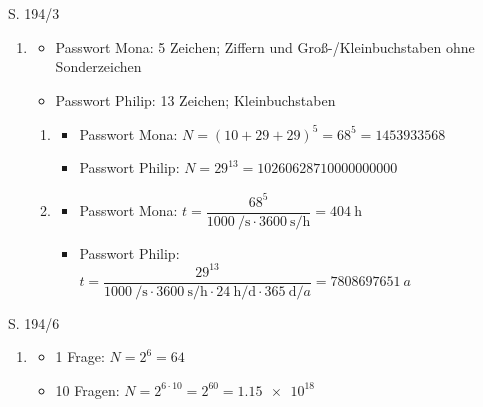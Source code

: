 \begin{Exercise}{S. 194/3}{}
\begin{enumerate}[leftmargin=*]
    \item [3.]{
        \begin{itemize}[leftmargin=*]
            \item Passwort Mona: 5 Zeichen; Ziffern und Groß-/Kleinbuchstaben ohne Sonderzeichen
            \item Passwort Philip: 13 Zeichen; Kleinbuchstaben
        \end{itemize}
        \begin{enumerate}[label=\alph*),leftmargin=*]
            \item[a)] {
                \begin{itemize}[leftmargin=*]
                    \item Passwort Mona: \quad $N = (10 + 29 + 29)^5 = 68^5 = \SI{1453933568}{}$
                    \item Passwort Philip: \quad $N = 29^{13} = \SI{10260628710000000000}{}$
                \end{itemize}
                }
            \item[b)] {
                \begin{itemize}[leftmargin=*]
                    \item Passwort Mona: \quad $t = \dfrac{68^5}{\SI{1000}{\per\second} \cdot \SI{3600}{\second\per\hour}} = \SI{404}{\hour}$\\
                    \item Passwort Philip: \quad $t = \dfrac{29^{13}}{\SI{1000}{\per\second} \cdot \SI{3600}{\second\per\hour} \cdot \SI{24}{\hour\per\day} \cdot \SI{365}{\day\per a}} = \SI{7808697651}{a}$
                \end{itemize}
                }
        \end{enumerate}
        }
\end{enumerate}
\end{Exercise}

\begin{Exercise}{S. 194/6}{}
\begin{enumerate}[leftmargin=*]
    \item [6.]{
        \begin{itemize}[leftmargin=*]
            \item 1 Frage: \quad $N = 2^{6} = 64$
            \item 10 Fragen: \quad $N = 2^{6 \cdot 10} = 2^{60} = \SI{1.15e18}{}$
        \end{itemize}
    }
\end{enumerate}
\end{Exercise}
\pagebreak


